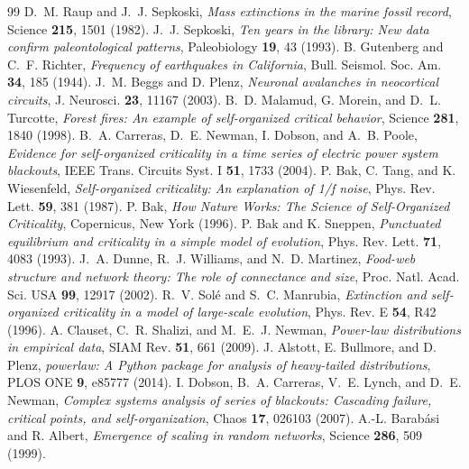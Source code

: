 \documentclass[10pt,a4paper,twocolumn]{article}
\begin{document}
\begingroup
\footnotesize
\setlength{\bibsep}{2pt plus 0.3ex}
\begin{thebibliography}{99}
 D.~M. Raup and J.~J. Sepkoski, \emph{Mass extinctions in the marine fossil record}, Science \textbf{215}, 1501 (1982).
 J.~J. Sepkoski, \emph{Ten years in the library: New data confirm paleontological patterns}, Paleobiology \textbf{19}, 43 (1993).
 B. Gutenberg and C.~F. Richter, \emph{Frequency of earthquakes in California}, Bull. Seismol. Soc. Am. \textbf{34}, 185 (1944).
 J.~M. Beggs and D. Plenz, \emph{Neuronal avalanches in neocortical circuits}, J. Neurosci. \textbf{23}, 11167 (2003).
 B.~D. Malamud, G. Morein, and D.~L. Turcotte, \emph{Forest fires: An example of self-organized critical behavior}, Science \textbf{281}, 1840 (1998).
 B.~A. Carreras, D.~E. Newman, I. Dobson, and A.~B. Poole, \emph{Evidence for self-organized criticality in a time series of electric power system blackouts}, IEEE Trans. Circuits Syst. I \textbf{51}, 1733 (2004).
 P. Bak, C. Tang, and K. Wiesenfeld, \emph{Self-organized criticality: An explanation of 1/f noise}, Phys. Rev. Lett. \textbf{59}, 381 (1987).
 P. Bak, \emph{How Nature Works: The Science of Self-Organized Criticality}, Copernicus, New York (1996).
 P. Bak and K. Sneppen, \emph{Punctuated equilibrium and criticality in a simple model of evolution}, Phys. Rev. Lett. \textbf{71}, 4083 (1993).
 J.~A. Dunne, R.~J. Williams, and N.~D. Martinez, \emph{Food-web structure and network theory: The role of connectance and size}, Proc. Natl. Acad. Sci. USA \textbf{99}, 12917 (2002).
 R.~V. Sol\'e and S.~C. Manrubia, \emph{Extinction and self-organized criticality in a model of large-scale evolution}, Phys. Rev. E \textbf{54}, R42 (1996).
 A. Clauset, C.~R. Shalizi, and M.~E.~J. Newman, \emph{Power-law distributions in empirical data}, SIAM Rev. \textbf{51}, 661 (2009).
 J. Alstott, E. Bullmore, and D. Plenz, \emph{powerlaw: A Python package for analysis of heavy-tailed distributions}, PLOS ONE \textbf{9}, e85777 (2014).
 I. Dobson, B.~A. Carreras, V.~E. Lynch, and D.~E. Newman, \emph{Complex systems analysis of series of blackouts: Cascading failure, critical points, and self-organization}, Chaos \textbf{17}, 026103 (2007).
 A.-L. Barab\'asi and R. Albert, \emph{Emergence of scaling in random networks}, Science \textbf{286}, 509 (1999).
\end{thebibliography}
\endgroup
\end{document}
